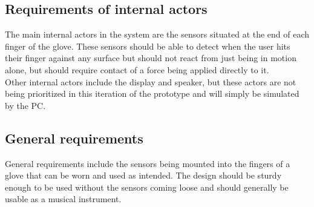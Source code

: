 


\subsection{Requirements of internal actors}
The main internal actors in the system are the sensors situated at the end of each finger of the glove. These sensors should be able to detect when the user hits their finger against any surface but should not react from just being in motion alone, but should require contact of a force being applied directly to it. \\
Other internal actors include the display and speaker, but these actors are not being prioritized in this iteration of the prototype and will simply be simulated by the PC.

\subsection{General requirements}
General requirements include the sensors being mounted into the fingers of a glove that can be worn and used as intended. The design should be sturdy enough to be used without the sensors coming loose and should generally be usable as a musical instrument.


